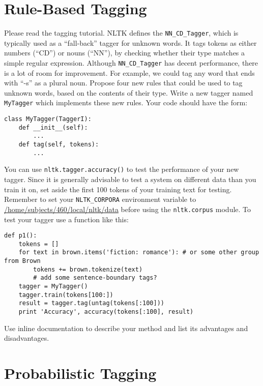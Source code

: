 \documentclass{460}
\begin{document}
\maketitle

\section{Rule-Based Tagging}

Please read the tagging tutorial.
NLTK defines the \texttt{NN\_CD\_Tagger}, which is typically used as a
``fall-back'' tagger for unknown words.  It tags tokens as either
numbers (``CD'') or nouns (``NN''), by checking whether their type
matches a simple regular expression.  Although \texttt{NN\_CD\_Tagger}
has decent performance, there is a lot of room for improvement.  For
example, we could tag any word that ends with ``-s'' as a plural noun.
Propose four new rules that could be used to tag unknown words, based
on the contents of their type.
Write a new tagger named \texttt{MyTagger} which implements these new
rules.  Your code should have the form:

\begin{verbatim}
class MyTagger(TaggerI):
    def __init__(self):
        ...
    def tag(self, tokens):
        ...
\end{verbatim}

You can use \texttt{nltk.tagger.accuracy()}
to test the performance of your new tagger.  Since it is generally
advisable to test a system on different data than you train it on,
set aside the first 100 tokens of your training text
for testing.  Remember to set your
\texttt{NLTK\_CORPORA} environment variable to
\url{/home/subjects/460/local/nltk/data} before using the
\texttt{nltk.corpus} module.
To test your tagger use a function like this:

\begin{verbatim}
def p1():
    tokens = []
    for text in brown.items('fiction: romance'): # or some other group from Brown
        tokens += brown.tokenize(text)
        # add some sentence-boundary tags?
    tagger = MyTagger()
    tagger.train(tokens[100:])
    result = tagger.tag(untag(tokens[:100]))
    print 'Accuracy', accuracy(tokens[:100], result)
\end{verbatim}

Use inline documentation to describe your method and list its advantages
and disadvantages.

\section{Probabilistic Tagging}
\end{document}
